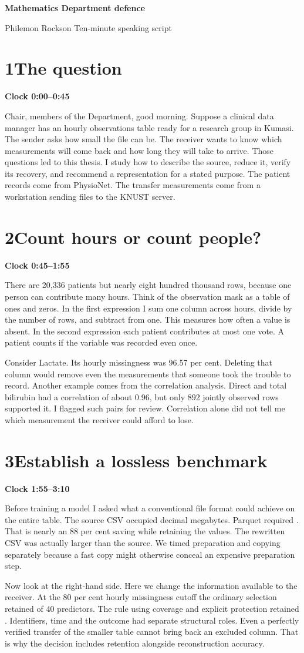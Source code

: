 \documentclass[11pt,a4paper]{article}
\newcommand{\cue}[3]{\section*{\color{forest}#1\quad #2}\textbf{Clock #3}\par}
\begin{document}
{\Large\bfseries Mathematics Department defence}\par
Philemon Rockson \hfill Ten-minute speaking script
\cue{1}{The question}{0:00--0:45}
Chair, members of the Department, good morning. Suppose a clinical data manager has an hourly observations table ready for a research group in Kumasi. The sender asks how small the file can be. The receiver wants to know which measurements will come back and how long they will take to arrive. Those questions led to this thesis. I study how to describe the source, reduce it, verify its recovery, and recommend a representation for a stated purpose. The patient records come from PhysioNet. The transfer measurements come from a workstation sending files to the KNUST server.

\cue{2}{Count hours or count people?}{0:45--1:55}
There are 20,336 patients but nearly eight hundred thousand rows, because one person can contribute many hours. Think of the observation mask as a table of ones and zeros. In the first expression I sum one column across hours, divide by the number of rows, and subtract from one. This measures how often a value is absent. In the second expression each patient contributes at most one vote. A patient counts if the variable was recorded even once.

Consider Lactate. Its hourly missingness was 96.57 per cent. Deleting that column would remove even the measurements that someone took the trouble to record. Another example comes from the correlation analysis. Direct and total bilirubin had a correlation of about 0.96, but only 892 jointly observed rows supported it. I flagged such pairs for review. Correlation alone did not tell me which measurement the receiver could afford to lose.

\newpage
\cue{3}{Establish a lossless benchmark}{1:55--3:10}
Before training a model I asked what a conventional file format could achieve on the entire table. The source CSV occupied \studyCsvMB{} decimal megabytes. Parquet required \studyParquetMB. That is nearly an 88 per cent saving while retaining the values. The rewritten CSV was actually larger than the source. We timed preparation and copying separately because a fast copy might otherwise conceal an expensive preparation step.

Now look at the right-hand side. Here we change the information available to the receiver. At the 80 per cent hourly missingness cutoff the ordinary selection retained \studyKept{} of 40 predictors. The rule using coverage and explicit protection retained \studyProtected. Identifiers, time and the outcome had separate structural roles. Even a perfectly verified transfer of the smaller table cannot bring back an excluded column. That is why the decision includes retention alongside reconstruction accuracy.
\end{document}
